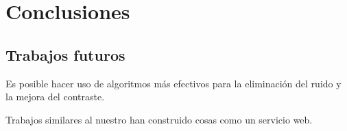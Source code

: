 \chapter{Conclusiones}

\section{Trabajos futuros}

Es posible hacer uso de algoritmos más efectivos para la eliminación del ruido y
la mejora del contraste. 

Trabajos similares al nuestro \cite{heath2000digital} han construido cosas como un servicio web.


